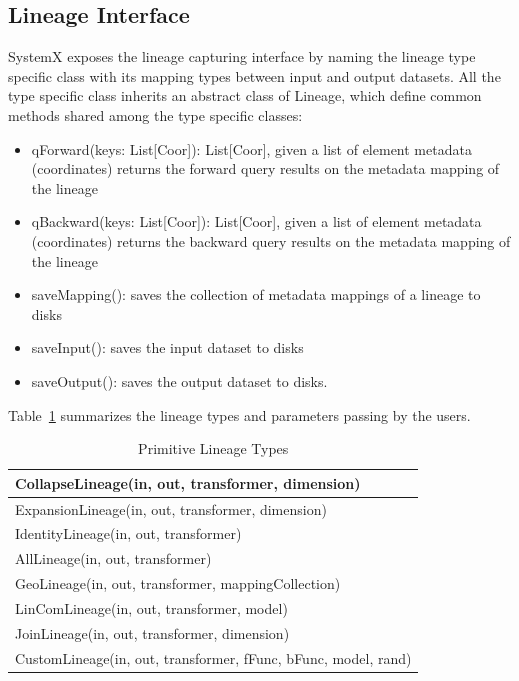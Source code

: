 \documentclass{sig-alternate}
\newenvironment{shortlist}{
        \vspace*{-0.5em}
  \begin{itemize}
  \setlength{\itemsep}{-0.1em}
}{
  \end{itemize}
        \vspace*{-0.5em}
}
\begin{document}
\subsection{Lineage Interface}
\label{sec:Design-Lineage}
SystemX exposes the lineage capturing interface by naming the lineage type specific class with its mapping types between input and output datasets.
All the type specific class inherits an abstract class of Lineage, which define common methods shared among the type specific classes:
\begin{shortlist}
\item{} qForward(keys: List[Coor]): List[Coor], given a list of element metadata (coordinates) returns the forward query results on the metadata mapping of the lineage
\item{} qBackward(keys: List[Coor]): List[Coor], given a list of element metadata (coordinates) returns the backward query results on the metadata mapping of the lineage
\item{} saveMapping(): saves the collection of metadata mappings of a lineage to disks
\item{} saveInput(): saves the input dataset to disks
\item{} saveOutput(): saves the output dataset to disks.
\end{shortlist}


Table~\ref{tb:lineage-interface} summarizes the lineage types and parameters passing by the users.
\begin{table}[t]
\begin{center}
    \caption{Primitive Lineage Types}
    \begin{scriptsize}
    \begin{tabular}{ | p{8cm}|}
    \hline
    CollapseLineage(in, out, transformer, dimension) \\ \hline 
    ExpansionLineage(in, out, transformer, dimension) \\ \hline
    IdentityLineage(in, out, transformer) \\ \hline
    AllLineage(in, out, transformer) \\ \hline
    GeoLineage(in, out, transformer, mappingCollection) \\ \hline
    LinComLineage(in, out, transformer, model) \\ \hline
    JoinLineage(in, out, transformer, dimension) \\ \hline
    CustomLineage(in, out, transformer, fFunc, bFunc, model, rand) \\ \hline
    \end{tabular}
    \end{scriptsize}
    \label{tb:lineage-interface}
\end{center}   
\end{table}
\end{document}
